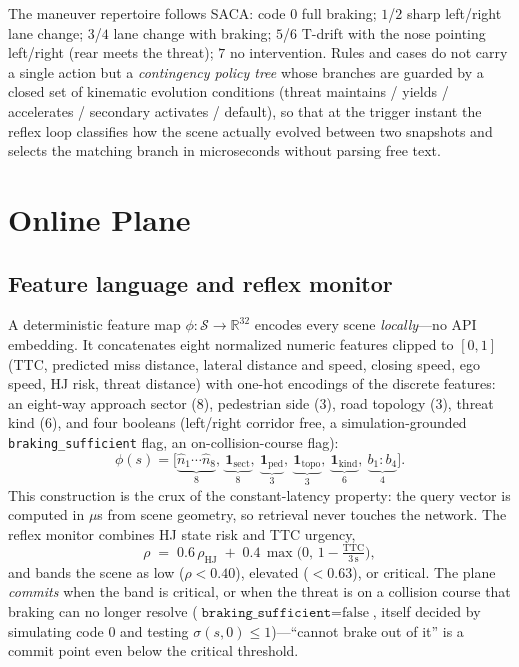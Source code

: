 \documentclass[conference]{IEEEtran}
\begin{document}
The maneuver repertoire follows SACA: code $0$ full braking; $1$/$2$ sharp
left/right lane change; $3$/$4$ lane change with braking; $5$/$6$ T-drift
with the nose pointing left/right (rear meets the threat); $7$ no
intervention. Rules and cases do not carry a single action but a
\emph{contingency policy tree} whose branches are guarded by a closed set of
kinematic evolution conditions (threat maintains / yields / accelerates /
secondary activates / default), so that at the trigger instant the reflex
loop classifies how the scene actually evolved between two snapshots and
selects the matching branch in microseconds without parsing free text.

\section{Online Plane}

\subsection{Feature language and reflex monitor}
A deterministic feature map $\phi:\mathcal{S}\to\mathbb{R}^{32}$ encodes every
scene \emph{locally}---no API embedding. It concatenates eight normalized
numeric features clipped to $[0,1]$ (TTC, predicted miss distance, lateral
distance and speed, closing speed, ego speed, HJ risk, threat distance) with
one-hot encodings of the discrete features: an eight-way approach sector
($8$), pedestrian side ($3$), road topology ($3$), threat kind ($6$), and four
booleans (left/right corridor free, a simulation-grounded
\texttt{braking\_sufficient} flag, an on-collision-course flag):
\begin{equation}
\phi(s)=\big[\underbrace{\hat n_1\!\cdots\hat n_8}_{8},\ \underbrace{\mathbf{1}_{\mathrm{sect}}}_{8},\ \underbrace{\mathbf{1}_{\mathrm{ped}}}_{3},\ \underbrace{\mathbf{1}_{\mathrm{topo}}}_{3},\ \underbrace{\mathbf{1}_{\mathrm{kind}}}_{6},\ \underbrace{b_1{:}b_4}_{4}\big].
\end{equation}
This construction is the crux of the constant-latency property: the query
vector is computed in $\mu$s from scene geometry, so retrieval never touches
the network. The reflex monitor combines HJ state risk and TTC urgency,
\begin{equation}
\rho \;=\; 0.6\,\rho_{\mathrm{HJ}} \;+\; 0.4\,\max\!\Big(0,\,1-\tfrac{\mathrm{TTC}}{3\,\mathrm{s}}\Big),
\end{equation}
and bands the scene as low ($\rho<0.40$), elevated ($<0.63$), or critical.
The plane \emph{commits} when the band is critical, or when the threat is on a
collision course that braking can no longer resolve
($\texttt{braking\_sufficient}=\text{false}$, itself decided by simulating
code $0$ and testing $\sigma(s,0)\le1$)---``cannot brake out of it'' is a
commit point even below the critical threshold.
\end{document}

